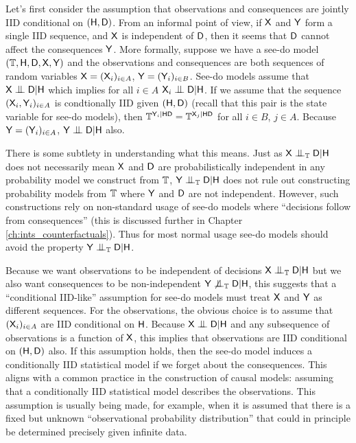 Let's first consider the assumption that observations and consequences are jointly IID conditional on $(\mathsf{H},\mathsf{D})$. From an informal point of view, if $\mathsf{X}$ and $\mathsf{Y}$ form a single IID sequence, and $\mathsf{X}$ is independent of $\mathsf{D}$, then it seems that $\mathsf{D}$ cannot affect the consequences $\mathsf{Y}$. More formally, suppose we have a see-do model $(\mathbb{T},\mathsf{H},\mathsf{D},\mathsf{X},\mathsf{Y})$ and the observations and consequences are both sequences of random variables $\mathsf{X}=(\mathsf{X}_i)_{i\in A}$, $\mathsf{Y}=(\mathsf{Y}_i)_{i\in B}$. See-do models assume that $\RV{X}\CI\RV{D}|\RV{H}$ which implies for all $i\in A$ $\RV{X}_i\CI\RV{D}|\RV{H}$. If we assume that the sequence $(\mathsf{X}_i,\mathsf{Y}_i)_{i\in A}$ is condtionally IID given $(\mathsf{H},\mathsf{D})$ (recall that this pair is the state variable for see-do models), then $\mathbb{T}^{\mathsf{Y}_i|\mathsf{HD}}=\mathbb{T}^{\mathsf{X}_j|\mathsf{HD}}$ for all $i\in B$, $j\in A$. Because $\mathsf{Y}=(\mathsf{Y}_i)_{i\in A}$, $\RV{Y}\CI \RV{D}|\RV{H}$ also.

There is some subtlety in understanding what this means. Just as $\RV{X}\CI_{\kernel{T}}\RV{D}|\RV{H}$ does not necessarily mean $\mathsf{X}$ and $\mathsf{D}$ are probabilistically independent in any probability model we construct from $\mathbb{T}$, $\RV{Y}\CI_{\kernel{T}}\RV{D}|\RV{H}$ does not rule out constructing probability models from $\mathbb{T}$ where $\mathsf{Y}$ and $\mathsf{D}$ are not independent. However, such constructions rely on non-standard usage of see-do models where ``decisions follow from consequences'' (this is discussed further in Chapter \ref{ch:ints_counterfactuals}). Thus for most normal usage see-do models should avoid the property $\RV{Y}\CI_{\kernel{T}}\RV{D}|\RV{H}$.

Because we want observations to be independent of decisions $\RV{X}\CI_{\kernel{T}}\RV{D}|\RV{H}$ but we also want consequences to be non-independent $\RV{Y}\not\CI_{\kernel{T}}\RV{D}|\RV{H}$, this suggests that a ``conditional IID-like'' assumption for see-do models must treat $\mathsf{X}$ and $\mathsf{Y}$ as different sequences. For the observations, the obvious choice is to assume that $(\mathsf{X}_i)_{i\in A}$ are IID conditional on $\mathsf{H}$. Because $\RV{X}\CI\RV{D}|\RV{H}$ and any subsequence of observations is a function of $\mathsf{X}$, this implies that observations are IID conditional on $(\mathsf{H},\mathsf{D})$ also. If this assumption holds, then the see-do model induces a conditionally IID statistical model if we forget about the consequences. This aligns with a common practice in the construction of causal models: assuming that a conditionally IID statistical model describes the observations. This assumption is usually being made, for example, when it is assumed that there is a fixed but unknown ``observational probability distribution'' that could in principle be determined precisely given infinite data.

